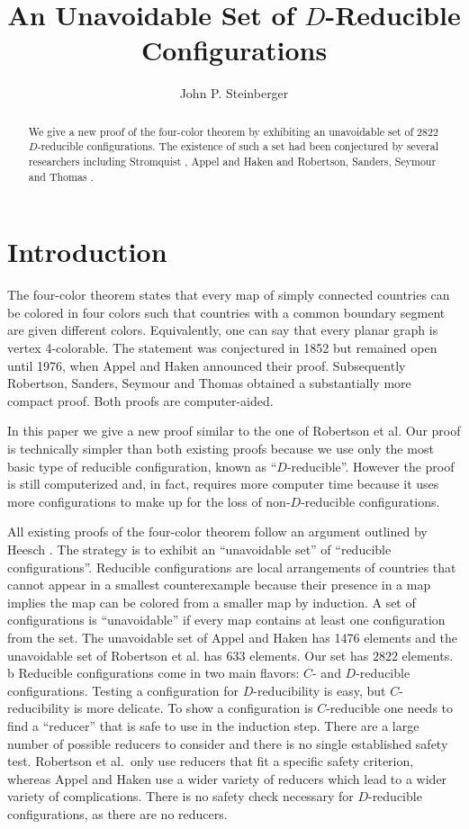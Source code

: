 \documentclass[11pt]{article}
\newcommand{\nc}{{$2822$ }}
\begin{document}
\title{An Unavoidable Set of $D$-Reducible Configurations}
\author{John P. Steinberger}
\maketitle

\begin{abstract}
We give a new proof of the four-color theorem by exhibiting an unavoidable
set of \nc $D$-reducible configurations. The existence of such a set had
been conjectured by several researchers including Stromquist \cite{stromquist}, Appel and
Haken \cite{ah1} and Robertson, Sanders, Seymour and Thomas \cite{rsst}.
\end{abstract}

\section{Introduction}

The four-color theorem states that every map of simply connected countries can be colored in four colors such that countries with a common boundary segment are given different colors. Equivalently, one can say that every planar graph is vertex 4-colorable. The statement was conjectured in 1852 but remained open until 1976, when Appel and Haken \cite{ah1, ah2} announced their proof. Subsequently Robertson, Sanders, Seymour and Thomas \cite{rsst} 
obtained a substantially more compact proof. Both proofs are computer-aided.

In this paper we give a new proof similar to the one of Robertson et al. Our proof is technically simpler than both existing proofs because we use only the most basic type of reducible configuration, known as ``$D$-reducible''. However the proof is still computerized and, in fact, requires more computer time because it uses more configurations to make up for the loss of non-$D$-reducible configurations. 

All existing proofs of the four-color theorem follow an argument outlined by Heesch \cite{heesch}. The strategy is to exhibit an ``unavoidable set'' of ``reducible configurations''. Reducible configurations are local arrangements of countries that cannot appear in a smallest counterexample because their presence in a map implies the map can be colored from a smaller map by induction. A set of configurations is ``unavoidable'' if every map contains at least one configuration from the set. The unavoidable set of Appel and Haken has 1476 elements and the unavoidable set of Robertson et al. has 633 elements. Our set has \nc elements.
b
Reducible configurations come in two main flavors: $C$- and $D$-reducible configurations. Testing a configuration for $D$-reducibility is easy, but $C$-reducibility is more delicate. To show a configuration is $C$-reducible one needs to find a ``reducer'' that is safe to use in the induction step. There are a large number of possible reducers to consider and there is no single established safety test. Robertson et al.~only use reducers that fit a specific  safety criterion, whereas Appel and Haken use a wider variety of reducers which lead to a wider variety of complications. There is no safety check necessary for $D$-reducible configurations, as there are no reducers. 
\end{document}
